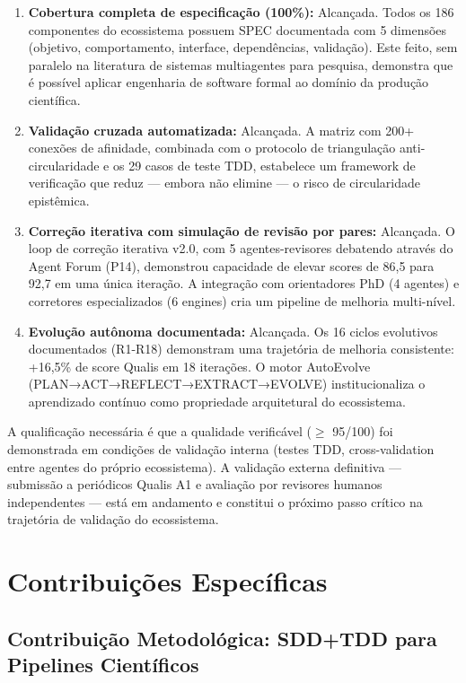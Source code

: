 \begin{enumerate}
  \item \textbf{Cobertura completa de especificação (100\%):} Alcançada. Todos os 186 componentes do ecossistema possuem SPEC documentada com 5 dimensões (objetivo, comportamento, interface, dependências, validação). Este feito, sem paralelo na literatura de sistemas multiagentes para pesquisa, demonstra que é possível aplicar engenharia de software formal ao domínio da produção científica.
  \item \textbf{Validação cruzada automatizada:} Alcançada. A matriz com 200+ conexões de afinidade, combinada com o protocolo de triangulação anti-circularidade e os 29 casos de teste TDD, estabelece um framework de verificação que reduz --- embora não elimine --- o risco de circularidade epistêmica.
  \item \textbf{Correção iterativa com simulação de revisão por pares:} Alcançada. O loop de correção iterativa v2.0, com 5 agentes-revisores debatendo através do Agent Forum (P14), demonstrou capacidade de elevar scores de 86,5 para 92,7 em uma única iteração. A integração com orientadores PhD (4 agentes) e corretores especializados (6 engines) cria um pipeline de melhoria multi-nível.
  \item \textbf{Evolução autônoma documentada:} Alcançada. Os 16 ciclos evolutivos documentados (R1-R18) demonstram uma trajetória de melhoria consistente: +16,5\% de score Qualis em 18 iterações. O motor AutoEvolve (PLAN→ACT→REFLECT→EXTRACT→EVOLVE) institucionaliza o aprendizado contínuo como propriedade arquitetural do ecossistema.
\end{enumerate}

A qualificação necessária é que a qualidade verificável ($\geq$ 95/100) foi demonstrada em condições de validação interna (testes TDD, cross-validation entre agentes do próprio ecossistema). A validação externa definitiva --- submissão a periódicos Qualis A1 e avaliação por revisores humanos independentes --- está em andamento e constitui o próximo passo crítico na trajetória de validação do ecossistema.

\section{Contribuições Específicas}

\subsection{Contribuição Metodológica: SDD+TDD para Pipelines Científicos}


